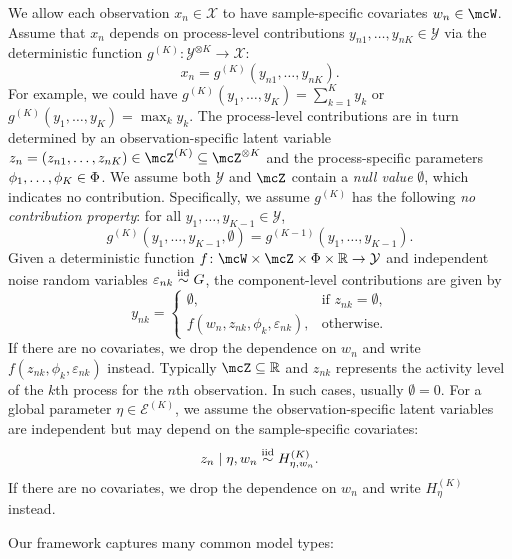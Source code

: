 We allow each observation $x_n \in \mathcal{X}$ to have sample-specific covariates $w_n \in \mcW$.
Assume that $x_n$ depends on process-level contributions $y_{n1},\dots,y_{nK} \in \mathcal{Y}$ via the deterministic function $g^{(K)} \colon \mathcal{Y}^{\otimes K} \to \mathcal{X}$:
\[
	x_n = g^{(K)}(y_{n1}, \dots, y_{nK}).
\]
For example, we could have $g^{(K)}(y_1,\dots,y_K) = \sum_{k=1}^K y_k$ or $g^{(K)}(y_1,\dots,y_K) = \max_{k} y_{k}$.
The process-level contributions are in turn
determined by an observation-specific latent variable $z_n  = (z_{n1},\dots,z_{nK}) \in \mcZ^{(K)} \subseteq \mcZ^{\otimes K}$ and the process-specific parameters $\phi_1,\dots,\phi_K \in \Phi$.
We assume both $\mathcal{Y}$ and $\mcZ$ contain a \emph{null value} $\emptyset$, which indicates no contribution.
Specifically, we assume $g^{(K)}$ has the following \emph{no contribution property}: for all $y_1,\dots,y_{K-1} \in \mathcal{Y}$,
\[
	g^{(K)}(y_{1}, \dots, y_{K-1}, \emptyset) = g^{(K-1)}(y_{1}, \dots, y_{K-1}).
\]
Given a deterministic function
$f \colon \mcW \times \mcZ \times \Phi \times \reals \to \mathcal{Y}$
and independent noise random variables
$
	\varepsilon_{nk} \stackrel{\text{iid}}{\sim} G
$,
the component-level contributions are given by
\[
	y_{nk} = \begin{cases}
		\emptyset,                                  & \text{if $z_{nk} = \emptyset$,} \\
		f(w_{n}, z_{nk}, \phi_k, \varepsilon_{nk}), & \text{otherwise}.
	\end{cases}
\]
If there are no covariates, we drop the dependence on $w_n$ and write $f(z_{nk}, \phi_k, \varepsilon_{nk})$ instead.
Typically $\mcZ \subseteq \reals$ and $z_{nk}$ represents the activity level of the $k$th process for the $n$th observation.
In such cases, usually $\emptyset = 0$.
For a global parameter $\eta \in \mathcal{E}^{(K)}$, we assume the observation-specific latent variables are independent but may depend on the sample-specific covariates:
\[
	z_n \mid \eta, w_n \stackrel{\text{iid}}{\sim} H^{(K)}_{\eta,w_n}.
\]
If there are no covariates, we drop the dependence on $w_{n}$ and write $H^{(K)}_{\eta}$ instead.

Our framework captures many common model types: 

